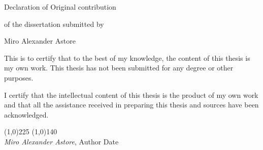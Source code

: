 \newpage
\begin{center}
Declaration of Original contribution

\vspace{0.5in}

of the dissertation submitted by

\vspace{0.25in}

Miro Alexander Astore

\end{center}

\vspace{0.5in}

\noindent This is to certify that to the best of my knowledge, the content of this 
thesis is my own work. This thesis has not been submitted for any degree or other 
purposes.

\noindent I certify that the intellectual content of this thesis is the product of 
my own work and that all the assistance received in preparing this thesis and sources 
have been acknowledged.

\vspace{1in}


\noindent \line(1,0){225} \hspace{3.0cm} \line(1,0){140} \\
 {\em Miro Alexander Astore}, Author \hspace{6.75cm} Date
